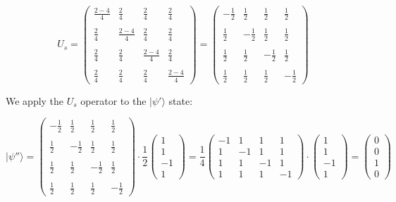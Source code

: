 \begin{example}
\[ U_s = \begin{pmatrix} \frac{2 - 4}{4} & \frac{2}{4} & \frac{2}{4} & \frac{2}{4} \\ \\ \frac{2}{4} & \frac{2 - 4}{4} & \frac{2}{4} & \frac{2}{4} \\ \\ \frac{2}{4} & \frac{2}{4} & \frac{2 - 4}{4} & \frac{2}{4} \\ \\ \frac{2}{4} & \frac{2}{4} & \frac{2}{4} & \frac{2 - 4}{4} \end{pmatrix} = \begin{pmatrix} -\frac{1}{2} & \frac{1}{2} & \frac{1}{2} & \frac{1}{2} \\ \\ \frac{1}{2} & -\frac{1}{2} & \frac{1}{2} & \frac{1}{2} \\ \\ \frac{1}{2} & \frac{1}{2} & -\frac{1}{2} & \frac{1}{2} \\ \\ \frac{1}{2} & \frac{1}{2} & \frac{1}{2} & -\frac{1}{2} \end{pmatrix}\]

We apply the $U_s$ operator to the $|\psi'\rangle$ state:

\[ |\psi''\rangle = \begin{pmatrix} -\frac{1}{2} & \frac{1}{2} & \frac{1}{2} & \frac{1}{2} \\ \\ \frac{1}{2} & -\frac{1}{2} & \frac{1}{2} & \frac{1}{2} \\ \\ \frac{1}{2} & \frac{1}{2} & -\frac{1}{2} & \frac{1}{2} \\ \\ \frac{1}{2} & \frac{1}{2} & \frac{1}{2} & -\frac{1}{2} \end{pmatrix} \cdot \frac{1}{2}\begin{pmatrix} 1 \\ 1 \\ -1 \\ 1 \end{pmatrix} =  \frac{1}{4} \begin{pmatrix} -1 & 1 & 1 & 1 \\ 1 & -1 & 1 & 1 \\ 1 & 1 & -1 & 1 \\ 1 & 1 & 1 & -1 \end{pmatrix} \cdot \begin{pmatrix} 1 \\ 1 \\ -1 \\ 1 \end{pmatrix} = \begin{pmatrix} 0 \\ 0 \\ 1 \\ 0 \end{pmatrix}\]


\end{example}
